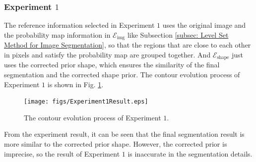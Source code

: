 \subsubsection{Experiment $1$}
The reference information selected in Experiment $1$ uses the original image and the probability map information in $\mathcal{E}_{\text{img}}$ like Subsection \ref{subsec: Level Set Method for Image Segmentation}, so that the regions that are close to each other in pixels and satisfy the probability map are grouped together. And $\mathcal{E}_{\text{shape}}$ just uses the corrected prior shape, which ensures the similarity of the final segmentation and the corrected shape prior. The contour evolution process of Experiment $1$ is shown in Fig. \ref{fig: The contour evolution process of Experiment 1}.
\begin{figure}[ht]
    \centering
    \texttt{[image: figs/Experiment1Result.eps]}
    \caption{The contour evolution process of Experiment $1$.}
    \label{fig: The contour evolution process of Experiment 1}
\end{figure}
From the experiment result, it can be seen that the final segmentation result is more similar to the corrected prior shape. However, the corrected prior is imprecise, so the result of Experiment $1$ is inaccurate in the segmentation details.

